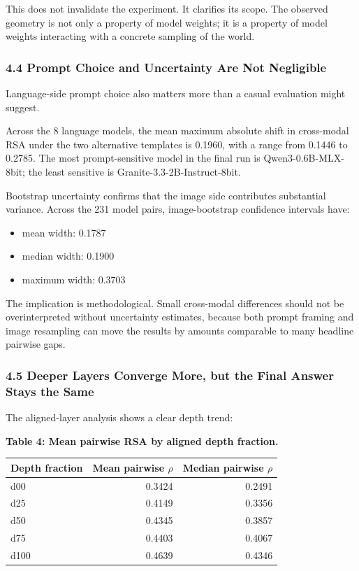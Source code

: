 \documentclass[
]{article}
\newcounter{none} %
\providecommand{\tightlist}{%
  \setlength{\itemsep}{0pt}\setlength{\parskip}{0pt}}
\begin{document}
This does not invalidate the experiment. It clarifies its scope. The
observed geometry is not only a property of model weights; it is a
property of model weights interacting with a concrete sampling of the
world.

\subsubsection{4.4 Prompt Choice and Uncertainty Are Not
Negligible}\label{prompt-choice-and-uncertainty-are-not-negligible}

Language-side prompt choice also matters more than a casual evaluation
might suggest.

Across the 8 language models, the mean maximum absolute shift in
cross-modal RSA under the two alternative templates is 0.1960, with a
range from 0.1446 to 0.2785. The most prompt-sensitive model in the
final run is Qwen3-0.6B-MLX-8bit; the least sensitive is
Granite-3.3-2B-Instruct-8bit.

Bootstrap uncertainty confirms that the image side contributes
substantial variance. Across the 231 model pairs, image-bootstrap
confidence intervals have:

\begin{itemize}
\tightlist
\item
  mean width: 0.1787
\item
  median width: 0.1900
\item
  maximum width: 0.3703
\end{itemize}

The implication is methodological. Small cross-modal differences should
not be overinterpreted without uncertainty estimates, because both
prompt framing and image resampling can move the results by amounts
comparable to many headline pairwise gaps.

\subsubsection{4.5 Deeper Layers Converge More, but the Final Answer
Stays the
Same}\label{deeper-layers-converge-more-but-the-final-answer-stays-the-same}

The aligned-layer analysis shows a clear depth trend:

\textbf{Table 4: Mean pairwise RSA by aligned depth fraction.}

{\def\LTcaptype{none} %
\begin{longtable}[]{@{}lrr@{}}
\toprule\noalign{}
Depth fraction & Mean pairwise \(\rho\) & Median pairwise \(\rho\) \\
\midrule\noalign{}
\endhead
\bottomrule\noalign{}
\endlastfoot
d00 & 0.3424 & 0.2491 \\
d25 & 0.4149 & 0.3356 \\
d50 & 0.4345 & 0.3857 \\
d75 & 0.4403 & 0.4067 \\
d100 & 0.4639 & 0.4346 \\
\end{longtable}
}
\end{document}
